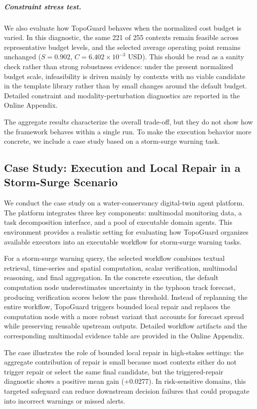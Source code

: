 \documentclass[acmsmall,review,anonymous]{acmart}
\begin{document}
\subparagraph{Constraint stress test.}
We also evaluate how TopoGuard behaves when the normalized cost budget is varied. In this diagnostic, the same 221 of 255 contexts remain feasible across representative budget levels, and the selected average operating point remains unchanged ($S=0.902$, $C=6.402\times10^{-3}$ USD). This should be read as a sanity check rather than strong robustness evidence: under the present normalized budget scale, infeasibility is driven mainly by contexts with no viable candidate in the template library rather than by small changes around the default budget. Detailed constraint and modality-perturbation diagnostics are reported in the Online Appendix.

The aggregate results characterize the overall trade-off, but they do not show how the framework behaves within a single run. To make the execution behavior more concrete, we include a case study based on a storm-surge warning task.

\subsection{Case Study: Execution and Local Repair in a Storm-Surge Scenario}

We conduct the case study on a water-conservancy digital-twin agent platform. The platform integrates three key components: multimodal monitoring data, a task decomposition interface, and a pool of executable domain agents. This environment provides a realistic setting for evaluating how TopoGuard organizes available executors into an executable workflow for storm-surge warning tasks.

For a storm-surge warning query, the selected workflow combines textual retrieval, time-series and spatial computation, scalar verification, multimodal reasoning, and final aggregation. In the concrete execution, the default computation node underestimates uncertainty in the typhoon track forecast, producing verification scores below the pass threshold. Instead of replanning the entire workflow, TopoGuard triggers bounded local repair and replaces the computation node with a more robust variant that accounts for forecast spread while preserving reusable upstream outputs. Detailed workflow artifacts and the corresponding multimodal evidence table are provided in the Online Appendix.

The case illustrates the role of bounded local repair in high-stakes settings: the aggregate contribution of repair is small because most contexts either do not trigger repair or select the same final candidate, but the triggered-repair diagnostic shows a positive mean gain (+0.0277). In risk-sensitive domains, this targeted safeguard can reduce downstream decision failures that could propagate into incorrect warnings or missed alerts.
\end{document}
